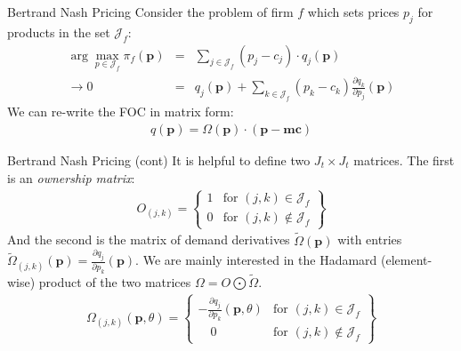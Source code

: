 \documentclass[xcolor=pdftex,dvipsnames,table,mathserif,aspectratio=169]{beamer}
\begin{document}
\begin{frame}{Bertrand Nash Pricing}
Consider the problem of firm $f$ which sets prices $p_j$ for products in the set $\mathcal{J}_f$:
\begin{eqnarray*}
\arg \max_{p \in \mathcal{J}_f} \pi_f (\mathbf{p}) &=& \sum_{j \in \mathcal{J}_f} (p_j - c_j) \cdot q_j(\mathbf{p}) \\
\rightarrow 0&=& q_j(\mathbf{p}) + \sum_{k \in \mathcal{J}_f} (p_k - c_k) \frac{\partial q_{k}}{\partial p_j}(\mathbf{p})
\end{eqnarray*}
We can re-write the FOC in matrix form:
\begin{eqnarray*}
q(\mathbf{p}) = \Omega(\mathbf{p})\cdot(\mathbf{p}-\mathbf{mc})
\end{eqnarray*}
\end{frame}

\begin{frame}{Bertrand Nash Pricing (cont)}
It is helpful to define two $J_t \times J_t$ matrices. The first is an \textit{ownership matrix}:
\begin{eqnarray*}
O_{(j,k)} = \left\{\begin{array}{lr}
          1 & \text{for }  (j,k) \in \mathcal{J}_f\\
       	  0 & \text{for } (j,k) \notin \mathcal{J}_f
        \end{array} \right\}
\end{eqnarray*}
And the second is the matrix of demand derivatives $\tilde{\Omega}(\mathbf{p})$ with entries $\tilde{\Omega}_{(j,k)}(\mathbf{p})=\frac{\partial q_{j}}{\partial p_k}(\mathbf{p})$. We are mainly interested in the Hadamard (element-wise) product of the two matrices $\Omega = O\bigodot\tilde{\Omega}$.
\begin{eqnarray*}
\Omega_{(j,k)}(\mathbf{p},\theta) = \left\{\begin{array}{lr}
         - \frac{\partial q_{j}}{\partial p_k}(\mathbf{p},\theta) & \text{for }  (j,k) \in \mathcal{J}_f\\
       	  \quad 0 & \text{for } (j,k) \notin \mathcal{J}_f
        \end{array} \right\}
\end{eqnarray*}
\end{frame}
\end{document}
